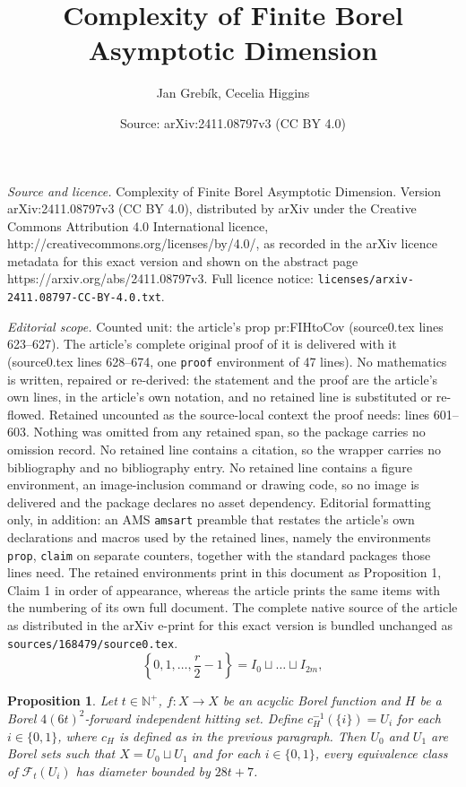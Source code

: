 \documentclass[10pt,a4paper]{amsart}
\title{Complexity of Finite Borel Asymptotic Dimension}
\author{Jan Greb\'ik, Cecelia Higgins}
\date{Source: arXiv:2411.08797v3 (CC BY 4.0)}
\newtheorem{prop}{Proposition}
\newcommand{\N}{\mathbb N}
\newcommand\mcal{\mathcal}
\begin{document}
\maketitle

\noindent\emph{Source and licence.} Complexity of Finite Borel Asymptotic Dimension. Version arXiv:2411.08797v3 (CC BY 4.0), distributed by arXiv under the Creative Commons Attribution 4.0 International licence, http://creativecommons.org/licenses/by/4.0/, as recorded in the arXiv licence metadata for this exact version and shown on the abstract page https://arxiv.org/abs/2411.08797v3. Full licence notice: \texttt{licenses/arxiv-2411.08797-CC-BY-4.0.txt}.\par\smallskip

\noindent\textit{Editorial scope.} Counted unit: the article's prop pr:FIHtoCov (source0.tex lines 623--627). The article's complete original proof of it is delivered with it (source0.tex lines 628--674, one \texttt{proof} environment of 47 lines). No mathematics is written, repaired or re-derived: the statement and the proof are the article's own lines, in the article's own notation, and no retained line is substituted or re-flowed.  Retained uncounted as the source-local context the proof needs: lines 601--603.  Nothing was omitted from any retained span, so the package carries no omission record.  No retained line contains a citation, so the wrapper carries no bibliography and no bibliography entry.  No retained line contains a figure environment, an image-inclusion command or drawing code, so no image is delivered and the package declares no asset dependency.  Editorial formatting only, in addition: an AMS \texttt{amsart} preamble that restates the article's own declarations and macros used by the retained lines, namely the environments \texttt{prop}, \texttt{claim} on separate counters, together with the standard packages those lines need.  The retained environments print in this document as Proposition 1, Claim 1 in order of appearance, whereas the article prints the same items with the numbering of its own full document.  The complete native source of the article as distributed in the arXiv e-print for this exact version is bundled unchanged as \texttt{sources/168479/source0.tex}.
    \begin{equation}\label{eq:Decomp}
        \left\{0,1,\dots,\frac{r}{2}-1\right\}=I_0\sqcup \dots\sqcup I_{2m},
    \end{equation}

    \begin{prop}\label{pr:FIHtoCov}
        Let $t\in \N^+$, $f:X\to X$ be an acyclic Borel function and $H$ be a Borel $4(6t)^2$-forward independent hitting set.
        Define $c^{-1}_H(\{i\})=U_i$ for each $i\in \{0,1\}$, where $c_H$ is defined as in the previous paragraph.
        Then $U_0$ and $U_1$ are Borel sets such that $X=U_0\sqcup U_1$ and for each $i \in \{0, 1\}$, every equivalence class of $\mcal{F}_t(U_i)$ has diameter bounded by $28t+7$.
    \end{prop}
\end{document}
